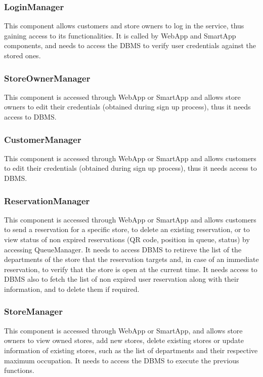 \subsubsection{LoginManager}
This component allows customers and store owners to log in the service, thus gaining access to its functionalities. It is called by WebApp and SmartApp components, and needs to access the DBMS to verify user credentials against the stored ones.
\subsubsection{StoreOwnerManager}
This component is accessed through WebApp or SmartApp and allows store owners to edit their credentials (obtained during sign up process), thus it needs access to DBMS.
\subsubsection{CustomerManager}
This component is accessed through WebApp or SmartApp and allows customers to edit their credentials (obtained during sign up process), thus it needs access to DBMS.
\subsubsection{ReservationManager}
This component is accessed through WebApp or SmartApp and allows customers to send a reservation for a specific store, to delete an existing reservation, or to view status of non expired reservations (QR code, position in queue, status) by accessing QueueManager. It needs to access DBMS to retireve the list of the departments of the store that the reservation targets and, in case of an immediate reservation, to verify that the store is open at the current time. It needs access to DBMS also to fetch the list of non expired user reservation along with their information, and to delete them if required.
\subsubsection{StoreManager}
This component is accessed through WebApp or SmartApp, and allows store owners to view owned stores, add new stores, delete existing stores or update information of existing stores, such as the list of departments and their respective maximum occupation. It needs to access the DBMS to execute the previous functions.
